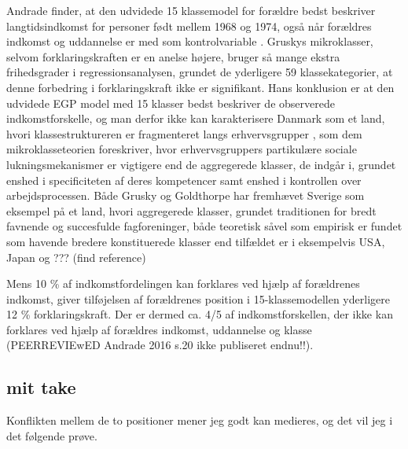 Andrade finder, at den udvidede 15 klassemodel for forældre bedst beskriver langtidsindkomst for personer født mellem 1968 og 1974, også når forældres indkomst og uddannelse er med som kontrolvariable \parencite[108]{Andrade2014}. Gruskys mikroklasser, selvom forklaringskraften er en anelse højere, bruger så mange ekstra frihedsgrader i regressionsanalysen, grundet de yderligere 59 klassekategorier, at denne forbedring i forklaringskraft ikke er signifikant. Hans konklusion er at den udvidede EGP model med 15 klasser bedst beskriver de observerede indkomstforskelle, og man derfor ikke kan karakterisere Danmark som et land, hvori klassestruktureren er fragmenteret langs erhvervsgrupper \parencite[109]{Andrade2014}, som dem mikroklasseteorien foreskriver, hvor erhvervsgruppers partikulære sociale lukningsmekanismer er vigtigere end de aggregerede klasser, de indgår i, grundet enshed i specificiteten af deres kompetencer samt enshed i kontrollen over arbejdsprocessen. Både Grusky og Goldthorpe har fremhævet Sverige som eksempel på et land, hvori aggregerede klasser, grundet traditionen for bredt favnende og succesfulde fagforeninger, både teoretisk såvel som empirisk er fundet som havende bredere konstituerede klasser end tilfældet er i eksempelvis USA, Japan og ??? (find reference) 

Mens 10 \% af indkomstfordelingen kan forklares ved hjælp af forældrenes indkomst, giver tilføjelsen af forældrenes position i 15-klassemodellen yderligere 12 \% forklaringskraft. Der er dermed ca. 4/5 af indkomstforskellen, der ikke kan forklares ved hjælp af forældres indkomst, uddannelse og klasse (PEERREVIEwED Andrade 2016 s.20 ikke publiseret endnu!!).


\subsection{mit take \label{2_gruskycomeback}}

Konflikten mellem de to positioner mener jeg godt kan medieres, og det vil jeg i det følgende prøve.

